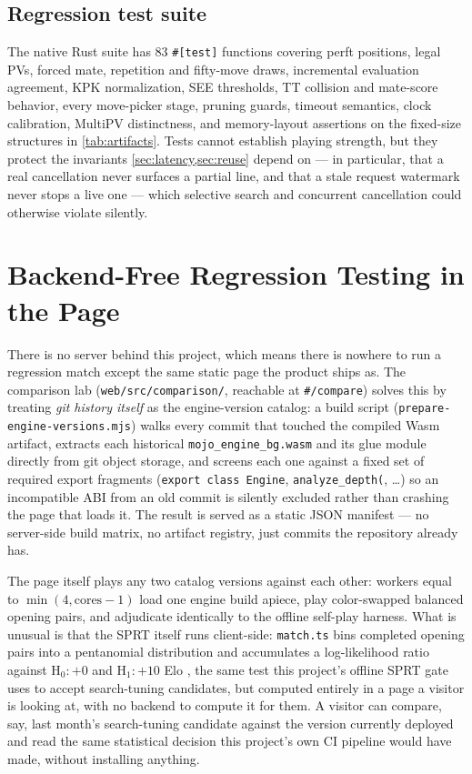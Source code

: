 \documentclass[10pt,twocolumn]{article}
\newcommand{\code}[1]{\texttt{#1}}
\begin{document}
\subsection{Regression test suite}

The native Rust suite has 83 \code{\#[test]} functions covering perft positions, legal PVs, forced
mate, repetition and fifty-move draws, incremental evaluation agreement, KPK
normalization, SEE thresholds, TT collision and mate-score behavior, every
move-picker stage, pruning guards, timeout semantics, clock calibration,
MultiPV distinctness, and memory-layout assertions on the fixed-size
structures in \cref{tab:artifacts}. Tests cannot establish playing strength,
but they protect the invariants \cref{sec:latency,sec:reuse} depend on ---
in particular, that a real cancellation never surfaces a partial line, and
that a stale request watermark never stops a live one --- which selective
search and concurrent cancellation could otherwise violate silently.

\section{Backend-Free Regression Testing in the Page}
\label{sec:comparison}

There is no server behind this project, which means there is nowhere to run
a regression match except the same static page the product ships as. The
comparison lab (\code{web/src/comparison/}, reachable at \code{\#/compare})
solves this by treating \emph{git history itself} as the engine-version
catalog: a build script (\code{prepare-engine-versions.mjs}) walks every
commit that touched the compiled Wasm artifact, extracts each historical
\code{mojo\_engine\_bg.wasm} and its glue module directly from git object
storage, and screens each one against a fixed set of required export
fragments (\code{export class Engine}, \code{analyze\_depth(}, \dots) so an
incompatible ABI from an old commit is silently excluded rather than
crashing the page that loads it. The result is served as a static JSON
manifest --- no server-side build matrix, no artifact registry, just
commits the repository already has.

The page itself plays any two catalog versions against each other: workers
equal to $\min(4, \text{cores}-1)$ load one engine build apiece, play
color-swapped balanced opening pairs, and adjudicate identically to the
offline self-play harness. What is unusual is that the SPRT itself runs
client-side: \code{match.ts} bins completed opening pairs into a pentanomial
distribution and accumulates a log-likelihood ratio against $\mathrm{H}_0{:}\allowbreak+0$
and $\mathrm{H}_1{:}\allowbreak+10$ Elo \citep{wald1945sprt}, the same test this project's
offline SPRT gate uses to accept search-tuning candidates, but computed
entirely in a page a visitor is looking at, with no backend to compute it for
them. A visitor can compare, say, last month's search-tuning candidate
against the version currently deployed and read the same statistical
decision this project's own CI pipeline would have made, without installing
anything.
\end{document}
